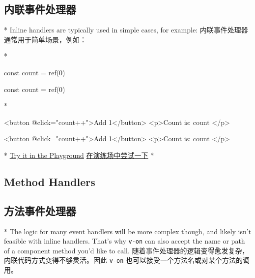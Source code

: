\begin{paracol}{2}
\subsection{内联事件处理器}
\switchcolumn[0]*%
Inline handlers are typically used in simple cases, for example:
\switchcolumn
内联事件处理器通常用于简单场景，例如：

\switchcolumn[0]*%
\begin{codeJs}
const count = ref(0)
\end{codeJs}
\switchcolumn
\begin{codeJs}
const count = ref(0)
\end{codeJs}
\switchcolumn[0]*%
\begin{codeHtml}
<button @click="count++">Add 1</button>
<p>Count is: {{ count }}</p>
\end{codeHtml}
\switchcolumn
\begin{codeHtml}
<button @click="count++">Add 1</button>
<p>Count is: {{ count }}</p>
\end{codeHtml}
\switchcolumn[0]*%
\href{https://play.vuejs.org/\#eNo9jssKgzAURH/lko0tgrbbEqX+Q5fZaLxiqHmQ3LgJ+fdqFZcD58xMYp1z1RqRvRgP0itHEJCia4VR2llPkMDjBBkmbzUUG1oII4y0JhBIGw2hh2Znbo+7MLw+WjZ/C4TaLT3hnogPkcgaeMtFyW8j2GmXpWBtN47w5PWBHLhrPzPCKfWDXRHmPsCAaOBfgSOkdH3IGUhpDBWv9/e8vsZZ/gFFhFJN}{Try
it in the Playground}
\switchcolumn
\href{https://play.vuejs.org/\#eNo9jssKgzAURH/lko0tgrbbEqX+Q5fZaLxiqHmQ3LgJ+fdqFZcD58xMYp1z1RqRvRgP0itHEJCia4VR2llPkMDjBBkmbzUUG1oII4y0JhBIGw2hh2Znbo+7MLw+WjZ/C4TaLT3hnogPkcgaeMtFyW8j2GmXpWBtN47w5PWBHLhrPzPCKfWDXRHmPsCAaOBfgSOkdH3IGUhpDBWv9/e8vsZZ/gFFhFJN}{在演练场中尝试一下}
\switchcolumn[0]*%
\subsection{Method Handlers}
\switchcolumn
\subsection{方法事件处理器}
\switchcolumn[0]*%
The logic for many event handlers will be more complex though, and
likely isn't feasible with inline handlers. That's why \texttt{v-on} can
also accept the name or path of a component method you'd like to call.
\switchcolumn
随着事件处理器的逻辑变得愈发复杂，内联代码方式变得不够灵活。因此
\texttt{v-on} 也可以接受一个方法名或对某个方法的调用。


\end{paracol}
